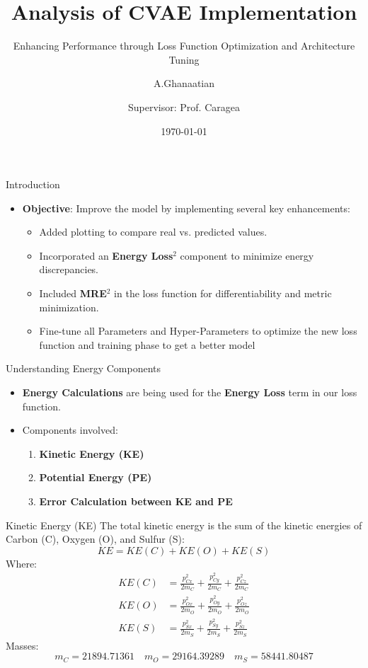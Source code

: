 \documentclass[9pt]{beamer}
\title[CVAE Implementation]{Analysis of CVAE Implementation}
\subtitle{Enhancing Performance through Loss Function Optimization and Architecture Tuning}
\author{A.Ghanaatian\and Supervisor: Prof. Caragea}
\date{\today} %
\begin{document}
\begin{frame}
  \titlepage
\end{frame}

\begin{frame}{Introduction}
  \begin{itemize}
    \item \textbf{Objective}: Improve the model by implementing several key enhancements:
    \begin{itemize}
      \item Added plotting to compare real vs. predicted values.
      \item Incorporated an \textbf{Energy Loss}$^2$ component to minimize energy discrepancies.
      \item Included \textbf{MRE}$^2$ in the loss function for differentiability and metric minimization.
      \item Fine-tune all Parameters and Hyper-Parameters to optimize the new loss function and training phase to get a better model
    \end{itemize}
  \end{itemize}
\end{frame}

\begin{frame}{Understanding Energy Components}
  \begin{itemize}
    \item \textbf{Energy Calculations} are being used for the \textbf{Energy Loss} term in our loss function.
    \item Components involved:
    \begin{enumerate}
      \item \textbf{Kinetic Energy (KE)}
      \item \textbf{Potential Energy (PE)}
      \item \textbf{Error Calculation between KE and PE}
    \end{enumerate}
  \end{itemize}
\end{frame}

\begin{frame}{Kinetic Energy (KE)}
  The total kinetic energy is the sum of the kinetic energies of Carbon (C), Oxygen (O), and Sulfur (S):
  \[
  KE = KE(C) + KE(O) + KE(S)
  \]
  Where:
  \[
  \begin{aligned}
  KE(C) &= \frac{p_{Cx}^2}{2m_C} + \frac{p_{Cy}^2}{2m_C} + \frac{p_{Cz}^2}{2m_C} \\
  KE(O) &= \frac{p_{Ox}^2}{2m_O} + \frac{p_{Oy}^2}{2m_O} + \frac{p_{Oz}^2}{2m_O} \\
  KE(S) &= \frac{p_{Sx}^2}{2m_S} + \frac{p_{Sy}^2}{2m_S} + \frac{p_{Sz}^2}{2m_S}
  \end{aligned}
  \]
  Masses:
  \[
  m_C = 21894.71361 \quad m_O = 29164.39289 \quad m_S = 58441.80487
  \]
\end{frame}
\end{document}
